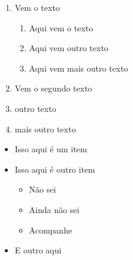 \documentclass[a4paper, 12pt]{article}
\begin{document}
\begin{enumerate}
	\item Vem o texto
	\begin{enumerate}
	\item Aqui vem o texto
	\item Aqui vem outro texto
	\item Aqui vem mais outro texto
	\end{enumerate}
	\item Vem o segundo texto
	\item outro texto
	\item mais outro texto
\end{enumerate}

\begin{itemize}
\item Isso aqui é um item
\item Isso aqui é outro item
\begin{itemize}
\item Não sei
\item Ainda não sei
\item Acompanhe
\end{itemize}
\item E outro aqui
\end{itemize}
\end{document}
